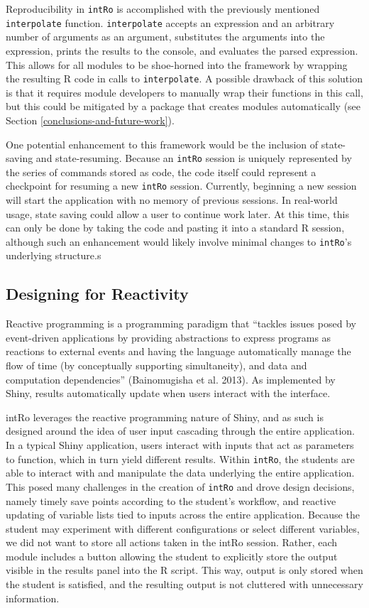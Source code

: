 \documentclass[12pt,]{article}
\begin{document}
Reproducibility in \texttt{intRo} is accomplished with the previously
mentioned \texttt{interpolate} function. \texttt{interpolate} accepts an
expression and an arbitrary number of arguments as an argument,
substitutes the arguments into the expression, prints the results to the
console, and evaluates the parsed expression. This allows for all
modules to be shoe-horned into the framework by wrapping the resulting R
code in calls to \texttt{interpolate}. A possible drawback of this
solution is that it requires module developers to manually wrap their
functions in this call, but this could be mitigated by a package that
creates modules automatically (see Section
\ref{conclusions-and-future-work}).

One potential enhancement to this framework would be the inclusion of
state-saving and state-resuming. Because an \texttt{intRo} session is
uniquely represented by the series of commands stored as code, the code
itself could represent a checkpoint for resuming a new \texttt{intRo}
session. Currently, beginning a new session will start the application
with no memory of previous sessions. In real-world usage, state saving
could allow a user to continue work later. At this time, this can only
be done by taking the code and pasting it into a standard R session,
although such an enhancement would likely involve minimal changes to
\texttt{intRo}'s underlying structure.s

\subsection{Designing for Reactivity}\label{designing-for-reactivity}

Reactive programming is a programming paradigm that ``tackles issues
posed by event-driven applications by providing abstractions to express
programs as reactions to external events and having the language
automatically manage the flow of time (by conceptually supporting
simultaneity), and data and computation dependencies'' (Bainomugisha et
al. 2013). As implemented by Shiny, results automatically update when
users interact with the interface.

intRo leverages the reactive programming nature of Shiny, and as such is
designed around the idea of user input cascading through the entire
application. In a typical Shiny application, users interact with inputs
that act as parameters to function, which in turn yield different
results. Within \texttt{intRo}, the students are able to interact with
and manipulate the data underlying the entire application. This posed
many challenges in the creation of \texttt{intRo} and drove design
decisions, namely timely save points according to the student's
workflow, and reactive updating of variable lists tied to inputs across
the entire application. Because the student may experiment with
different configurations or select different variables, we did not want
to store all actions taken in the intRo session. Rather, each module
includes a button allowing the student to explicitly store the output
visible in the results panel into the R script. This way, output is only
stored when the student is satisfied, and the resulting output is not
cluttered with unnecessary information.
\end{document}
